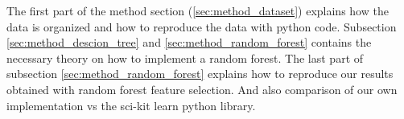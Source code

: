 The first part of the method section (\ref{sec:method_dataset}) explains how the data is organized and
how to reproduce the data with python code. Subsection
\ref{sec:method_descion_tree} and \ref{sec:method_random_forest} contains the
necessary theory on how to implement a random forest. The last part of
subsection \ref{sec:method_random_forest} explains how to reproduce our results
obtained with random forest feature selection. And also comparison of our own
implementation vs the sci-kit learn python library.  








